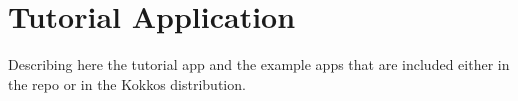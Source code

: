 \section{Tutorial Application}\label{chap:tutorial}

Describing here the tutorial app and the example apps that are included either in the repo or in the Kokkos distribution. 